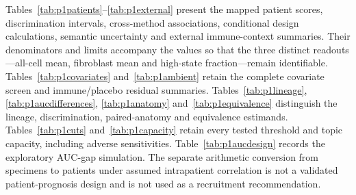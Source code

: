 \documentclass[10pt,a4paper]{article}
\begin{document}
Tables~\ref{tab:p1patients}--\ref{tab:p1external} present the mapped patient scores, discrimination intervals, cross-method associations, conditional design calculations, semantic uncertainty and external immune-context summaries. Their denominators and limits accompany the values so that the three distinct readouts---all-cell mean, fibroblast mean and high-state fraction---remain identifiable.
Tables~\ref{tab:p1covariates} and~\ref{tab:p1ambient} retain the complete covariate screen and immune/placebo residual summaries. Tables~\ref{tab:p1lineage}, \ref{tab:p1aucdifferences}, \ref{tab:p1anatomy} and~\ref{tab:p1equivalence} distinguish the lineage, discrimination, paired-anatomy and equivalence estimands. Tables~\ref{tab:p1cuts} and~\ref{tab:p1capacity} retain every tested threshold and topic capacity, including adverse sensitivities. Table~\ref{tab:p1aucdesign} records the exploratory AUC-gap simulation. The separate arithmetic conversion from specimens to patients under assumed intrapatient correlation is not a validated patient-prognosis design and is not used as a recruitment recommendation.
\end{document}
